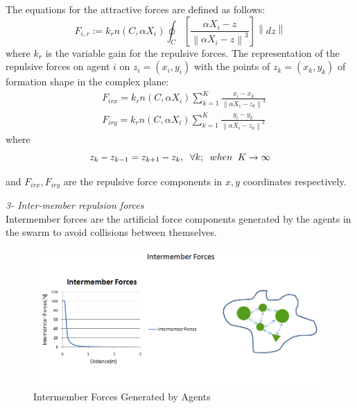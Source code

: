 \documentclass[twoside]{article}
\newcommand{\norm}[1]{\left\lVert#1\right\rVert}
\begin{document}
			The equations for the attractive forces are defined as follows:	
				\begin{equation}
F_{i,r} := k_r  n(C,\alpha X_i) \oint_C \left[\frac{\alpha X_i - z}{\norm{\alpha X_i - z}^3}\right] \norm{dz}
				\end{equation}
			where $k_r$ is the variable gain for the repulsive forces. The representation of the repulsive forces on agent $i$ on $z_i = (x_i, y_i)$ with the points of  $z_k = (x_k,y_k)$ of formation shape in the complex plane:
				\begin{align*}
				& F_{irx} = k_r n(C,\alpha X_i)  \sum_{k=1}^{K} \frac{x_i - x_k}{\norm{\alpha X_i - z_k}^3}\\
				& F_{iry} = k_r n(C,\alpha X_i)  \sum_{k=1}^{K} \frac{y_i - y_k}{\norm{\alpha X_i - z_k}^3}
				\end{align*}
						where
						\begin{equation}
						z_k - z_{k-1} = z_{k+1} - z_k, \hspace{0.2cm}  \forall k ;  \hspace{0.2cm} when  \hspace{0.2cm} K \to\infty
						\end{equation}
						
						and $F_{irx} , F_{iry} $ are the repulsive force components in $x,y$ coordinates respectively. \newline
						
					\textit{		3- Inter-member repulsion forces} \\ 
	
			Intermember forces are the artificial force components generated by the agents in the swarm to avoid collisions between themselves. 
			
			\begin{figure}[H]
				\caption{Intermember Forces Generated by Agents}
				\centering
				\includegraphics[scale = 0.60]{intermember_forces}
			\end{figure}
			
\end{document}
